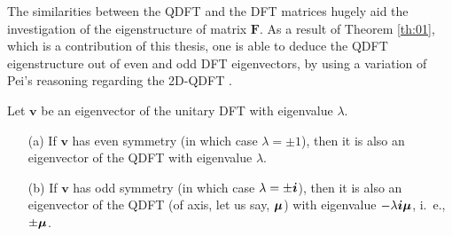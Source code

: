 The similarities between the QDFT and the DFT matrices hugely aid the investigation of the eigenstructure of matrix $ \mathbf{F} $. As a result of Theorem \ref{th:01}, which is a contribution of this thesis, one is able to deduce the QDFT eigenstructure out of even and odd DFT eigenvectors, by using a variation of Pei's reasoning regarding the 2D-QDFT \cite{pei2010eigenfunctions}.

\begin{theorem}
\label{th:01}
Let $ \mathbf{v} $ be an eigenvector of the unitary DFT with eigenvalue $ \lambda $.
\begin{itemize}[noitemsep]
\item[(a)] If $ \mathbf{v} $ has even symmetry (in which case $ \lambda = \pm 1 $), then it is also an eigenvector of the QDFT with eigenvalue $ \lambda $.
\item[(b)] If $ \mathbf{v} $ has odd symmetry (in which case $ \lambda = \pm \boldsymbol{i} $), then it is also an eigenvector of the QDFT (of axis, let us say, $ \boldsymbol{\mu} $) with eigenvalue $ -\lambda \boldsymbol{i} \boldsymbol{\mu}$, i.~e., $ \pm \boldsymbol{\mu} $.
\end{itemize}
\end{theorem}

